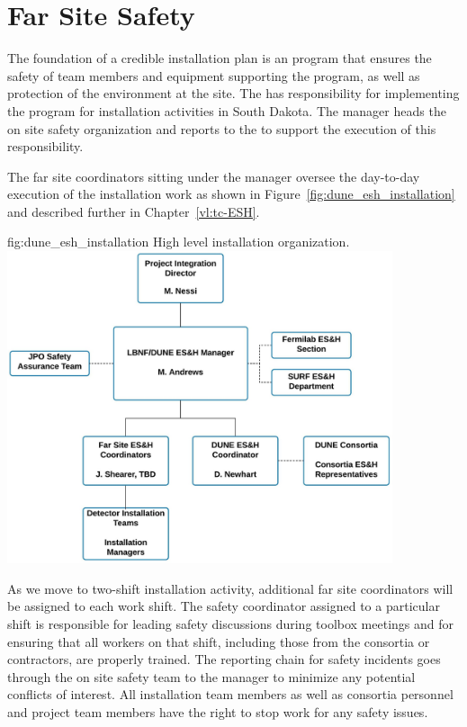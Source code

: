 \section{Far Site Safety}
\label{sec:far_site_safety}

The foundation of a credible installation plan is an 
program that ensures the safety of team members and
equipment supporting the program, as well as protection of the environment at
the  site.  The  has responsibility for
implementing the   program for 
installation activities in South Dakota.  The 
 manager heads the on site safety organization and reports
to the  to support the execution of this
responsibility.

The far site  coordinators sitting under the
  manager oversee the day-to-day execution
of the installation work as shown in
Figure~\ref{fig:dune_esh_installation} and described further in
Chapter~\ref{vl:tc-ESH}.
\begin{dunefigure}{fig:dune_esh_installation}
  {High level  installation  organization.}
  \includegraphics[width=0.85\textwidth]{graphics/DUNE_Installation_Safety_OrgChart}
\end{dunefigure}
As we move to two-shift installation activity, additional far site  
coordinators will be assigned to each work shift.  The safety coordinator 
assigned to a particular shift is responsible for leading safety discussions 
during  toolbox meetings and for ensuring that all workers on that shift, 
including those from the consortia or contractors, are properly trained.  The 
reporting chain for safety incidents goes through the on site safety team to 
the   manager to minimize any potential conflicts 
of interest.  All  installation team members as well as  
consortia personnel and  project team members have the right to 
stop work for any safety issues.

